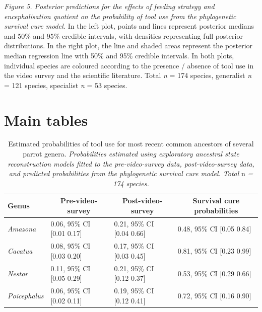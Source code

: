 \documentclass[
  man, donotrepeattitle,floatsintext]{apa6}
\begin{document}
\emph{Figure 5. Posterior predictions for the effects of feeding strategy and encephalisation quotient on the probability of tool use from the phylogenetic survival cure model.}
In the left plot, points and lines represent
posterior medians and 50\% and 95\% credible intervals, with densities
representing full posterior distributions. In the right plot, the line and
shaded areas represent the posterior median regression line with 50\% and 95\%
credible intervals. In both plots, individual species are coloured according to
the presence / absence of tool use in the video survey and the scientific
literature. Total \emph{n} = 174 species, generalist \emph{n} =
121 species, specialist \emph{n} =
53 species.







\newpage

\hypertarget{main-tables}{%
\section{Main tables}\label{main-tables}}

\begin{table}[H]

\begin{center}
\begin{threeparttable}

\caption{\label{tab:tableASR}Estimated probabilities of tool use for most recent common
ancestors of several parrot genera. \emph{Probabilities estimated using exploratory
ancestral state reconstruction models fitted to the pre-video-survey data,
post-video-survey data, and predicted probabilities from the phylogenetic
survival cure model. Total} n \emph{= 174 species.}}

\begin{tabular}{llll}
\toprule
Genus & \multicolumn{1}{c}{Pre-video-survey} & \multicolumn{1}{c}{Post-video-survey} & \multicolumn{1}{c}{Survival cure probabilities}\\
\midrule
\textit{Amazona} & 0.06, 95\% CI [0.01 0.17] & 0.21, 95\% CI [0.04 0.66] & 0.48, 95\% CI [0.05 0.84]\\
\textit{Cacatua} & 0.08, 95\% CI [0.03 0.20] & 0.17, 95\% CI [0.03 0.45] & 0.81, 95\% CI [0.23 0.99]\\
\textit{Nestor} & 0.11, 95\% CI [0.05 0.29] & 0.21, 95\% CI [0.12 0.37] & 0.53, 95\% CI [0.29 0.66]\\
\textit{Poicephalus} & 0.06, 95\% CI [0.02 0.11] & 0.19, 95\% CI [0.12 0.41] & 0.72, 95\% CI [0.16 0.90]\\
\bottomrule
\end{tabular}

\end{threeparttable}
\end{center}

\end{table}
\end{document}
